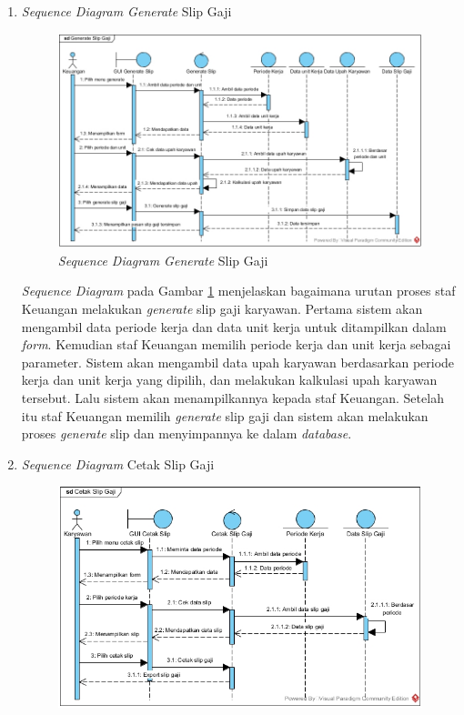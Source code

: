 \begin{enumerate}
            	\item \emph{Sequence Diagram Generate} Slip Gaji
			        \begin{figure}[H]
            		    \centering            		    \includegraphics[width=14cm]{gambar/sequence/generate-slip-gaji}
            		    \caption{\emph{Sequence Diagram Generate} Slip Gaji}
            		    \label{sequence_generate_slip}
            		\end{figure}
            		\emph{Sequence Diagram} pada Gambar \ref{sequence_generate_slip} menjelaskan bagaimana urutan proses staf Keuangan melakukan \emph{generate} slip gaji karyawan. Pertama sistem akan mengambil data periode kerja dan data unit kerja untuk ditampilkan dalam \emph{form}. Kemudian staf Keuangan memilih periode kerja dan unit kerja sebagai parameter. Sistem akan mengambil data upah karyawan berdasarkan periode kerja dan unit kerja yang dipilih, dan melakukan kalkulasi upah karyawan tersebut. Lalu sistem akan menampilkannya kepada staf Keuangan. Setelah itu staf Keuangan memilih \emph{generate} slip gaji dan sistem akan melakukan proses \emph{generate} slip dan menyimpannya ke dalam \emph{database}.
            		\newpage
            	\item \emph{Sequence Diagram} Cetak Slip Gaji
			        \begin{figure}[H]
            		    \centering            		    \includegraphics[width=12cm]{gambar/sequence/cetak-slip-gaji}

\end{figure}
\end{enumerate}
